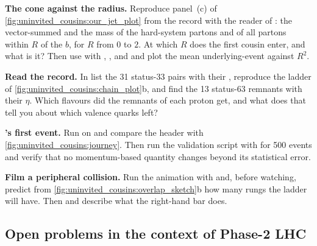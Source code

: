 \begin{exercises}
\item \textbf{The cone against the radius.} Reproduce panel~(c) of
  \cref{fig:uninvited_cousins:our_jet_plot} from the record with the reader
  of : the vector-summed \pt and the mass of the
  hard-system partons and of all partons within $R$ of the $b$, for $R$
  from $0$ to $2$. At which $R$ does the first cousin enter, and what is it?
  Then use  with , ,
   and  and plot the mean underlying-event \pt against
  $R^2$.
\item \textbf{Read the \CMSSW record.} In  list
  the 31 status-33 pairs with their \pt, reproduce the ladder of
  \cref{fig:uninvited_cousins:chain_plot}b, and find the 13 status-63
  remnants with their $\eta$. Which flavours did the remnants of each proton
  get, and what does that tell you about which valence quarks left?
\item \textbf{\PYTHIA's first event.} Run  on
   and compare the header with
  \cref{fig:uninvited_cousins:journey}. Then run the validation script
  with  for 500 events and verify that no momentum-based
  quantity changes beyond its statistical error.
\item \textbf{Film a peripheral collision.} Run the animation with
   and, before watching, predict from
  \cref{fig:uninvited_cousins:overlap_sketch}b how many rungs the ladder
  will have. Then  and describe what the
  right-hand bar does.
\end{exercises}

\subsection*{Open problems in the context of Phase-2 LHC}
\label{sec:uninvited_cousins:open_problems}

